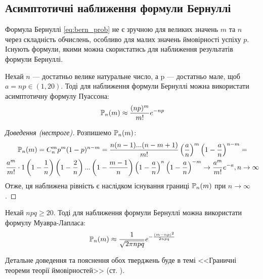 \subsection{Асимптотичні наближення формули Бернуллі}
Формула Бернуллі \eqref{eq:bern_prob} не є зручною для великих значень $m$ та $n$ через складність обчислень, особливо для малих значень ймовірності успіху $p$. Існують формули, якими можна 
скористатись для наближення результатів формули Бернуллі.
\begin{proposition*}
    Нехай $n$ --- достатньо велике натуральне число, а p --- достатньо мале, щоб 
    $a = np \in (1, 20)$. Тоді для наближення формули Бернуллі можна використати 
    асимптотичну формулу Пуассона:
    \begin{equation}\label{eq:poiss_aprox}
        \P_n(m) \approx \frac{(np)^m}{m!}e^{-np}
    \end{equation}
\end{proposition*}
\begin{proof}[Доведення (нестроге)] Розпишемо $\P_n(m)$:
    \begin{gather*}
        \P_n(m) = C_n^m p^m (1-p)^{n-m} = \frac{n(n-1)...(n-m+1)}{m!} \left(\frac{a}{n}\right)^m 
        \left(1-\frac{a}{n}\right)^{n-m} = \\
        \frac{a^m}{m!}\cdot 1 \left(1 - \frac{1}{n}\right)\left(1 - \frac{2}{n}\right)
        ...\left(1 - \frac{m-1}{n}\right)\left(1-\frac{a}{n}\right)^n \left(1-\frac{a}{n}\right)^{-m} 
        \to \frac{a^m}{m!}e^{-a}, n\to\infty
    \end{gather*}
    Отже, ця наближена рівність є наслідком існування границі $\P_n(m)$ при $n\to\infty$. 
\end{proof}
\begin{proposition*}
    Нехай $npq \geq 20$. Тоді для наближення формули Бернуллі можна використати 
    формулу Муавра-Лапласа:
    \begin{equation}\label{eq:laplace_approx}
        \P_n(m) \approx \frac{1}{\sqrt{2\pi npq}} e^{-\frac{(m-np)^2}{2npq}}
    \end{equation}
\end{proposition*}
Детальне доведення та пояснення обох тверджень буде в темі <<Граничні теореми теорії ймовірностей>> (ст. \pageref{binom_theorems}).

